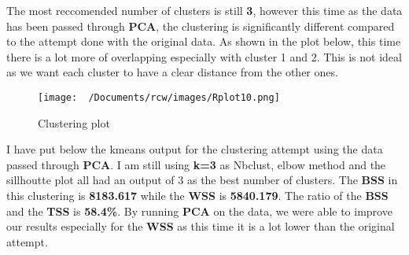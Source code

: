 \documentclass[11pt]{article}
\begin{document}
The most reccomended number of clusters is still \textbf{3}, however this time as the data has been passed through \textbf{PCA},
the clustering  is significantly different compared to the attempt done with the original data.
As shown in the plot below, this time there is a lot more of overlapping especially with cluster 1 and 2. This is not ideal as we want each cluster to have a clear distance 
from the other ones.
\begin{figure}[H]
  \centering
  \texttt{[image: ~/Documents/rcw/images/Rplot10.png]}
  \caption{Clustering plot}
\end{figure}
I have put below the kmeans output for the clustering attempt using the data passed through \textbf{PCA}.
I am still using \textbf{k=3} as Nbclust, elbow method and the sillhoutte plot all had an output of 3 as the best number of clusters.  
The \textbf{BSS} in this clustering is \textbf{8183.617} while the \textbf{WSS} is \textbf{5840.179}. 
The ratio of the \textbf{BSS} and the \textbf{TSS} is \textbf{58.4\%}.
By running \textbf{PCA} on the data, we were able to improve our results especially for the \textbf{WSS} as this time it is a lot lower than the original attempt.
\end{document}
